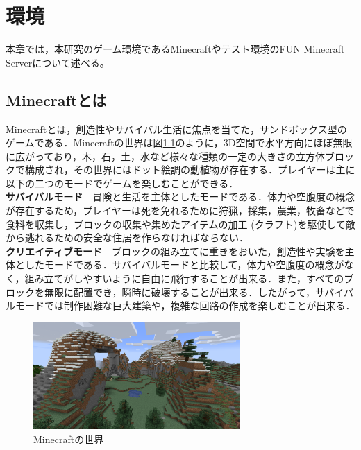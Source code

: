 \chapter{環境}	
\thispagestyle{plain}   %

本章では，本研究のゲーム環境であるMinecraftやテスト環境のFUN Minecraft Serverについて述べる。

\section{Minecraftとは}\label{sec:minecraft}
Minecraft\cite{bib:Minecraft}とは，創造性やサバイバル生活に焦点を当てた，サンドボックス型のゲームである．Minecraftの世界は図\ref{fig:mc_world}のように，3D空間で水平方向にほぼ無限に広がっており，木，石，土，水など様々な種類の一定の大きさの立方体ブロックで構成され，その世界にはドット絵調の動植物が存在する．プレイヤーは主に以下の二つのモードでゲームを楽しむことができる．\\

\textbf{サバイバルモード}　冒険と生活を主体としたモードである．体力や空腹度の概念が存在するため，プレイヤーは死を免れるために狩猟，採集，農業，牧畜などで食料を収集し，ブロックの収集や集めたアイテムの加工 (クラフト)を駆使して敵から逃れるための安全な住居を作らなければならない．\\

\textbf{クリエイティブモード}　ブロックの組み立てに重きをおいた，創造性や実験を主体としたモードである．サバイバルモードと比較して，体力や空腹度の概念がなく，組み立てがしやすいように自由に飛行することが出来る．また，すべてのブロックを無限に配置でき，瞬時に破壊することが出来る．したがって，サバイバルモードでは制作困難な巨大建築や，複雑な回路の作成を楽しむことが出来る．\\
\begin{figure}[H]
    \centering
    \includegraphics[width=0.7\textwidth]{fig/minecraft_world.png}
    \caption{Minecraftの世界}
    \label{fig:mc_world}
\end{figure}

